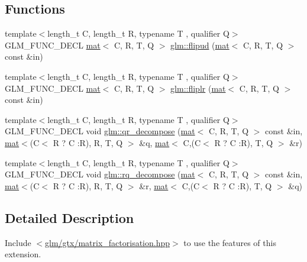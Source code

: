 \subsection*{Functions}
\begin{DoxyCompactItemize}
\item 
{\footnotesize template$<$length\+\_\+t C, length\+\_\+t R, typename T , qualifier Q$>$ }\\G\+L\+M\+\_\+\+F\+U\+N\+C\+\_\+\+D\+E\+CL \hyperlink{structglm_1_1mat}{mat}$<$ C, R, T, Q $>$ \hyperlink{group__gtx__matrix__factorisation_ga85003371f0ba97380dd25e8905de1870}{glm\+::flipud} (\hyperlink{structglm_1_1mat}{mat}$<$ C, R, T, Q $>$ const \&in)
\item 
{\footnotesize template$<$length\+\_\+t C, length\+\_\+t R, typename T , qualifier Q$>$ }\\G\+L\+M\+\_\+\+F\+U\+N\+C\+\_\+\+D\+E\+CL \hyperlink{structglm_1_1mat}{mat}$<$ C, R, T, Q $>$ \hyperlink{group__gtx__matrix__factorisation_gaf39f4e5f78eb29c1a90277d45b9b3feb}{glm\+::fliplr} (\hyperlink{structglm_1_1mat}{mat}$<$ C, R, T, Q $>$ const \&in)
\item 
{\footnotesize template$<$length\+\_\+t C, length\+\_\+t R, typename T , qualifier Q$>$ }\\G\+L\+M\+\_\+\+F\+U\+N\+C\+\_\+\+D\+E\+CL void \hyperlink{group__gtx__matrix__factorisation_ga77022dca1aa38add548f9f56a9f8071a}{glm\+::qr\+\_\+decompose} (\hyperlink{structglm_1_1mat}{mat}$<$ C, R, T, Q $>$ const \&in, \hyperlink{structglm_1_1mat}{mat}$<$(C$<$ R ? C \+:R), R, T, Q $>$ \&q, \hyperlink{structglm_1_1mat}{mat}$<$ C,(C$<$ R ? C \+:R), T, Q $>$ \&r)
\item 
{\footnotesize template$<$length\+\_\+t C, length\+\_\+t R, typename T , qualifier Q$>$ }\\G\+L\+M\+\_\+\+F\+U\+N\+C\+\_\+\+D\+E\+CL void \hyperlink{group__gtx__matrix__factorisation_ga4e022709c9e7eaad9d7cc315d2cdb05c}{glm\+::rq\+\_\+decompose} (\hyperlink{structglm_1_1mat}{mat}$<$ C, R, T, Q $>$ const \&in, \hyperlink{structglm_1_1mat}{mat}$<$(C$<$ R ? C \+:R), R, T, Q $>$ \&r, \hyperlink{structglm_1_1mat}{mat}$<$ C,(C$<$ R ? C \+:R), T, Q $>$ \&q)
\end{DoxyCompactItemize}


\subsection{Detailed Description}
Include $<$\hyperlink{matrix__factorisation_8hpp}{glm/gtx/matrix\+\_\+factorisation.\+hpp}$>$ to use the features of this extension.

